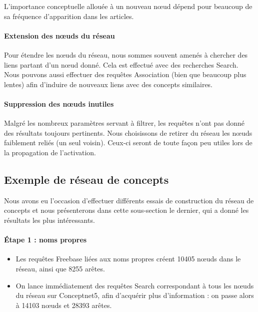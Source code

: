 \documentclass[a4paper, 12pt]{article}
\begin{document}
L'importance conceptuelle allouée à un nouveau n\oe ud dépend pour beaucoup de sa fréquence d'apparition dans les articles.


\paragraph{Extension des nœuds du réseau}

Pour étendre les n\oe uds du réseau, nous sommes souvent amenés à chercher des liens partant d'un n\oe ud donné. Cela est effectué avec des recherches Search. Nous pouvons aussi effectuer des requêtes Association (bien que beaucoup plus lentes) afin d'induire de nouveaux liens avec des concepts similaires.



\paragraph{Suppression des nœuds inutiles}
Malgré les nombreux paramètres servant à filtrer, les requêtes n'ont pas donné des résultats toujours pertinents. Nous choisissons de retirer du réseau les nœuds faiblement reliés (un seul voisin). Ceux-ci seront de toute fa\c{c}on peu utiles lors de la propagation de l'activation.


\subsection{Exemple de réseau de concepts}

Nous avons eu l'occasion d'effectuer différents essais de construction du réseau de concepts et nous présenterons dans cette sous-section le dernier, qui a donné les résultats les plus intéressants.

\paragraph{Étape 1 : noms propres}

\begin{itemize}
 \item Les requêtes Freebase liées aux noms propres créent 10405 n\oe uds dans le réseau, ainsi que 8255 arêtes.
 \item On lance immédiatement des requêtes Search correspondant à tous les n\oe uds du réseau sur Conceptnet5, afin d'acquérir plus d'information : on passe alors à 14103 n\oe uds et 28393 arêtes.
\end{itemize}
\end{document}
